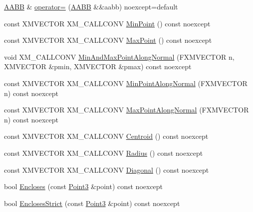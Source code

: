 \begin{DoxyCompactItemize}
\item 
\mbox{\hyperlink{classmage_1_1_a_a_b_b}{A\+A\+BB}} \& \mbox{\hyperlink{classmage_1_1_a_a_b_b_acc54304ce3bde3ea3aa2b487f2d975b7}{operator=}} (\mbox{\hyperlink{classmage_1_1_a_a_b_b}{A\+A\+BB}} \&\&aabb) noexcept=default
\item 
const X\+M\+V\+E\+C\+T\+OR X\+M\+\_\+\+C\+A\+L\+L\+C\+O\+NV \mbox{\hyperlink{classmage_1_1_a_a_b_b_ad351ed7fe9d7031e4d6eb68f4b4d69eb}{Min\+Point}} () const noexcept
\item 
const X\+M\+V\+E\+C\+T\+OR X\+M\+\_\+\+C\+A\+L\+L\+C\+O\+NV \mbox{\hyperlink{classmage_1_1_a_a_b_b_a98ec13950f8374c0bf6c4958f2203396}{Max\+Point}} () const noexcept
\item 
void X\+M\+\_\+\+C\+A\+L\+L\+C\+O\+NV \mbox{\hyperlink{classmage_1_1_a_a_b_b_ae5f7b990ef079e4ae0484e913f800135}{Min\+And\+Max\+Point\+Along\+Normal}} (F\+X\+M\+V\+E\+C\+T\+OR n, X\+M\+V\+E\+C\+T\+OR \&pmin, X\+M\+V\+E\+C\+T\+OR \&pmax) const noexcept
\item 
const X\+M\+V\+E\+C\+T\+OR X\+M\+\_\+\+C\+A\+L\+L\+C\+O\+NV \mbox{\hyperlink{classmage_1_1_a_a_b_b_a57e7a66ec6e418b2a5367e55b98ef547}{Min\+Point\+Along\+Normal}} (F\+X\+M\+V\+E\+C\+T\+OR n) const noexcept
\item 
const X\+M\+V\+E\+C\+T\+OR X\+M\+\_\+\+C\+A\+L\+L\+C\+O\+NV \mbox{\hyperlink{classmage_1_1_a_a_b_b_a91e0d95d5deaba8c96a36d490ed99a39}{Max\+Point\+Along\+Normal}} (F\+X\+M\+V\+E\+C\+T\+OR n) const noexcept
\item 
const X\+M\+V\+E\+C\+T\+OR X\+M\+\_\+\+C\+A\+L\+L\+C\+O\+NV \mbox{\hyperlink{classmage_1_1_a_a_b_b_a7555db5bea72d1e7ba04931fcbb88aa0}{Centroid}} () const noexcept
\item 
const X\+M\+V\+E\+C\+T\+OR X\+M\+\_\+\+C\+A\+L\+L\+C\+O\+NV \mbox{\hyperlink{classmage_1_1_a_a_b_b_a02d21281c08926f793804fb9f66869b3}{Radius}} () const noexcept
\item 
const X\+M\+V\+E\+C\+T\+OR X\+M\+\_\+\+C\+A\+L\+L\+C\+O\+NV \mbox{\hyperlink{classmage_1_1_a_a_b_b_ad3e011e47a16a9ecb84811296bbbcb1c}{Diagonal}} () const noexcept
\item 
bool \mbox{\hyperlink{classmage_1_1_a_a_b_b_a308fce591178a9aeaed3838dfa32972f}{Encloses}} (const \mbox{\hyperlink{structmage_1_1_point3}{Point3}} \&point) const noexcept
\item 
bool \mbox{\hyperlink{classmage_1_1_a_a_b_b_a0399860c66da2dfc593b6ad5702c7525}{Encloses\+Strict}} (const \mbox{\hyperlink{structmage_1_1_point3}{Point3}} \&point) const noexcept
\item 

\end{DoxyCompactItemize}

